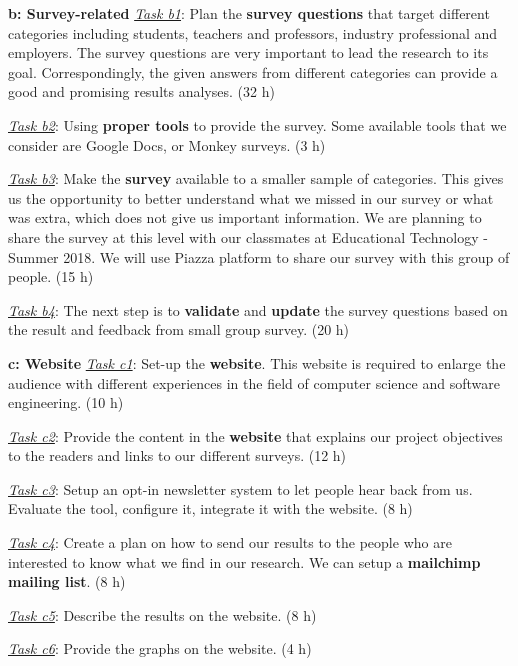 \documentclass{sigchi}
\begin{document}
\textbf{b: Survey-related}\newline
\textit{\underline{Task b1}}: Plan the \textbf{survey questions} that target different categories including students, teachers and professors, industry professional and employers. The survey questions are very important to lead the research to its goal. Correspondingly, the given answers from different categories can provide a good and promising results analyses. (32 h)

\textit{\underline{Task b2}}: Using \textbf{proper tools} to provide the survey. Some available tools that we consider are Google Docs, or Monkey surveys. (3 h)

\textit{\underline{Task b3}}: Make the \textbf{survey} available to a smaller sample of categories. This gives us the opportunity to better understand what we missed in our survey or what was extra, which does not give us important information. We are planning to share the survey at this level with our classmates at Educational Technology - Summer 2018. We will use Piazza platform to share our survey with this group of people. (15 h)

\textit{\underline{Task b4}}: The next step is to \textbf{validate} and \textbf{update} the survey questions based on the result and feedback from small group survey. (20 h)\newline

\textbf{c: Website}\newline
\textit{\underline{Task c1}}: Set-up the \textbf{website}. This website is required to enlarge the audience with different  experiences in the field of computer science and software engineering. (10 h)

\textit{\underline{Task c2}}: Provide the content in the \textbf{website} that explains our project objectives to the readers and links to our different surveys. (12 h)

\textit{\underline{Task c3}}: Setup an opt-in newsletter system to let people hear back from us. Evaluate the tool, 
configure it, integrate it with the website. (8 h)

\textit{\underline{Task c4}}: Create a plan on how to send our results to the people who are interested to know what we find in our research. We can setup a \textbf{mailchimp mailing list}. (8 h)

\textit{\underline{Task c5}}:  Describe the results on the website. (8 h)

\textit{\underline{Task c6}}: Provide the graphs on the website. (4 h)\newline
\end{document}
